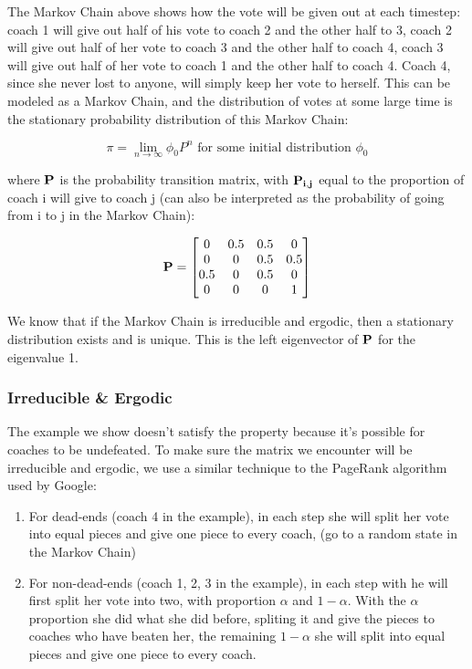 \documentclass[11pt,notitlepage]{article}
\begin{document}
\noindent The Markov Chain above shows how the vote will be given out at each timestep: coach 1 will give out half of his vote to coach 2 and the other half to 3, coach 2 will give out half of her vote to coach 3 and the other half to coach 4, coach 3 will give out half of her vote to coach 1 and the other half to coach 4. Coach 4, since she never lost to anyone, will simply keep her vote to herself. This can be modeled as a Markov Chain, and the distribution of votes at some large time is the stationary probability distribution of this Markov Chain:

$$ \pi = \lim_{n \rightarrow \infty} \phi_{0} P^n \mbox{ for some initial distribution } \phi_{0}$$

\noindent where $\bf{P}$ is the probability transition matrix, with $\bf{P}_{i,j}$ equal to the proportion of coach i will give to coach j (can also be interpreted as the probability of going from i to j in the Markov Chain):

\[
\bf{P} = 
\begin{bmatrix}
0 & 0.5 & 0.5 & 0 \\
0 & 0 & 0.5 & 0.5 \\
0.5 & 0 & 0.5 & 0 \\
0 & 0 & 0 & 1
\end{bmatrix}
\]

\noindent We know that if the Markov Chain is irreducible and ergodic, then a stationary distribution exists and is unique. This is the left eigenvector of $\bf{P}$ for the eigenvalue 1.


\subsubsection*{Irreducible \& Ergodic}

\noindent The example we show doesn't satisfy the property because it's possible for coaches to be undefeated. To make sure the matrix we encounter will be irreducible and ergodic, we use a similar technique to the PageRank algorithm used by Google:

\begin{enumerate}
\item For dead-ends (coach 4 in the example), in each step she will split her vote into equal pieces and give one piece to every coach, (go to a random state in the Markov Chain)
\item For non-dead-ends (coach 1, 2, 3 in the example), in each step with he will first split her vote into two, with proportion $\alpha$ and $1 - \alpha$. With the $\alpha$ proportion she did what she did before, spliting it and give the pieces to coaches who have beaten her, the remaining $1 - \alpha$ she will split into equal pieces and give one piece to every coach.
\end{enumerate}
\end{document}
